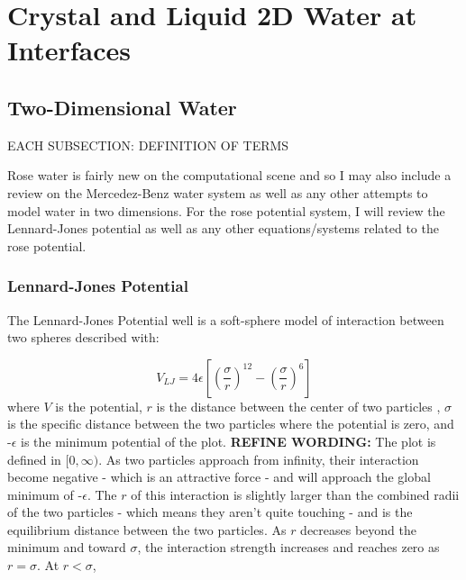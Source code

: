 \chapter{Crystal and Liquid 2D Water at Interfaces}
\label{ch:2DWater}


\section{Two-Dimensional Water}

EACH SUBSECTION: DEFINITION OF TERMS

Rose water is fairly new on the computational scene and so I may also include a review on the Mercedez-Benz water system as well as any other attempts to model water in two dimensions. For the rose potential system, I will review the Lennard-Jones potential  as well as any other equations/systems related to the rose potential.

\subsection{Lennard-Jones Potential}

The Lennard-Jones Potential well is a soft-sphere model of interaction between two spheres described with:

\begin{equation}
V_{LJ} = 4\epsilon[(\frac{\sigma}{r})^{12} - (\frac{\sigma}{r})^{6}]
\end{equation}
where $V$ is the potential, $r$ is the distance between the center of two particles , $\sigma$ is the specific distance between the two particles where the potential is zero, and -$\epsilon$ is the minimum potential of the plot.
\textbf{REFINE WORDING:}
The plot is defined in $[0,\infty)$.
As two particles approach from infinity, their interaction become negative - which is an attractive force - and will approach the global minimum of -$\epsilon$.
The $r$ of this interaction is slightly larger than the combined radii of the two particles - which means they aren't quite touching - and is the equilibrium distance between the two particles.
As $r$ decreases beyond the minimum and toward $\sigma$, the interaction strength increases and reaches zero as $r = \sigma$.
At $r < \sigma$, 

